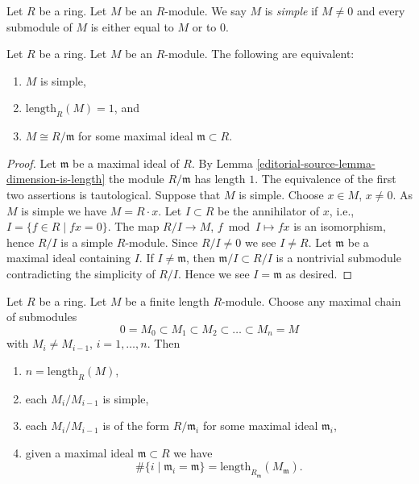\begin{definition}
\label{editorial-source-definition-simple-module}
Let $R$ be a ring. Let $M$ be an $R$-module.
We say $M$ is {\it simple} if $M \not = 0$ and
every submodule of $M$ is either equal to $M$ or
to $0$.
\end{definition}

\begin{lemma}
\label{editorial-source-lemma-characterize-length-1}
Let $R$ be a ring. Let $M$ be an $R$-module.
The following are equivalent:
\begin{enumerate}
\item $M$ is simple,
\item $\text{length}_R(M) = 1$, and
\item $M \cong R/\mathfrak m$ for some maximal ideal
$\mathfrak m \subset R$.
\end{enumerate}
\end{lemma}

\begin{proof}
Let $\mathfrak m$ be a maximal ideal of $R$.
By Lemma \ref{editorial-source-lemma-dimension-is-length} the module
$R/\mathfrak m$ has length $1$. The equivalence of
the first two assertions is tautological.
Suppose that $M$ is simple. Choose $x \in M$, $x \not = 0$.
As $M$ is simple we have $M = R \cdot x$.
Let $I \subset R$ be the annihilator of $x$, i.e.,
$I = \{f \in R \mid fx = 0\}$. The map $R/I \to M$,
$f \bmod I \mapsto fx$ is an isomorphism, hence
$R/I$ is a simple $R$-module. Since $R/I \not = 0$ we see $I \not = R$.
Let $\mathfrak m$ be a maximal ideal containing $I$.
If $I \not = \mathfrak m$, then $\mathfrak m /I \subset R/I$
is a nontrivial submodule contradicting the simplicity
of $R/I$. Hence we see $I = \mathfrak m$ as desired.
\end{proof}

\begin{lemma}
\label{editorial-source-lemma-simple-pieces}
Let $R$ be a ring. Let $M$ be a finite length $R$-module.
Choose any maximal chain of submodules
$$
0 = M_0 \subset M_1 \subset M_2 \subset \ldots \subset M_n = M
$$
with $M_i \not = M_{i-1}$, $i = 1, \ldots, n$. Then
\begin{enumerate}
\item $n = \text{length}_R(M)$,
\item each $M_i/M_{i-1}$ is simple,
\item each $M_i/M_{i-1}$ is of the form
$R/\mathfrak m_i$ for some maximal ideal $\mathfrak m_i$,
\item given a maximal ideal $\mathfrak m \subset R$
we have
$$
\# \{i \mid \mathfrak m_i = \mathfrak m\}
=
\text{length}_{R_{\mathfrak m}} (M_{\mathfrak m}).
$$
\end{enumerate}
\end{lemma}

